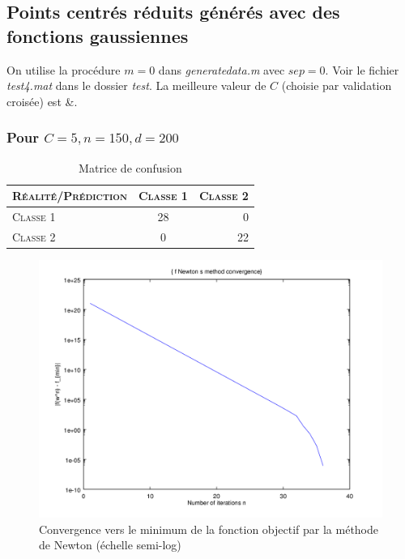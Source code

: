 \documentclass{article}
\begin{document}
\subsection{Points centrés réduits générés avec des fonctions gaussiennes}

On utilise la procédure $m=0$ dans \emph{generatedata.m} avec $sep=0$. Voir le fichier \emph{test4.mat} dans le dossier \emph{test}. La meilleure valeur de $C$ (choisie par validation croisée) est &.

\subsubsection{Pour $C=5, n=150, d=200$}

     \begin{table}[H]
       \caption{Matrice de confusion}
       \begin{tabular}{|l|c|r|}
         \hline
         \textsc{Réalité/Prédiction} & \textsc{Classe 1} & \textsc{Classe 2}\\
         \hline
         \textsc{Classe 1} & 28 & 0\\
         \hline
         \textsc{Classe 2} & 0 & 22\\
         \hline
       \end{tabular}
     \end{table}

         \begin{figure}
           \begin{center}
             \subfigure\includegraphics[scale=0.5]{images/cvnewton4.png}
             \caption{Convergence vers le minimum de la fonction objectif par la méthode de Newton (échelle semi-log)}
           \end{center}
         \end{figure}
\end{document}
